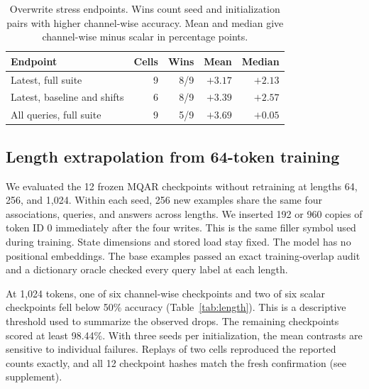 \documentclass[conference]{IEEEtran}
\begin{document}
\begin{table}[t]
\caption{Overwrite stress endpoints. Wins count seed and initialization pairs with higher channel-wise accuracy. Mean and median give channel-wise minus scalar in percentage points.}
\label{tab:stress-endpoint}
\centering
\small
\setlength{\tabcolsep}{4pt}
\begin{tabular}{lrrrr}
\toprule
Endpoint & Cells & Wins & Mean & Median \\
\midrule
Latest, full suite & 9 & 8/9 & $+3.17$ & $+2.13$ \\
Latest, baseline and shifts & 6 & 8/9 & $+3.39$ & $+2.57$ \\
All queries, full suite & 9 & 5/9 & $+3.69$ & $+0.05$ \\
\bottomrule
\end{tabular}
\end{table}

\subsection{Length extrapolation from 64-token training}
We evaluated the 12 frozen MQAR checkpoints without retraining at lengths 64, 256, and 1,024. Within each seed, 256 new examples share the same four associations, queries, and answers across lengths. We inserted 192 or 960 copies of token ID 0 immediately after the four writes. This is the same filler symbol used during training. State dimensions and stored load stay fixed. The model has no positional embeddings. The base examples passed an exact training-overlap audit and a dictionary oracle checked every query label at each length.

At 1,024 tokens, one of six channel-wise checkpoints and two of six scalar checkpoints fell below 50\% accuracy (Table~\ref{tab:length}). This is a descriptive threshold used to summarize the observed drops. The remaining checkpoints scored at least 98.44\%. With three seeds per initialization, the mean contrasts are sensitive to individual failures. Replays of two cells reproduced the reported counts exactly, and all 12 checkpoint hashes match the fresh confirmation (see supplement).
\end{document}

